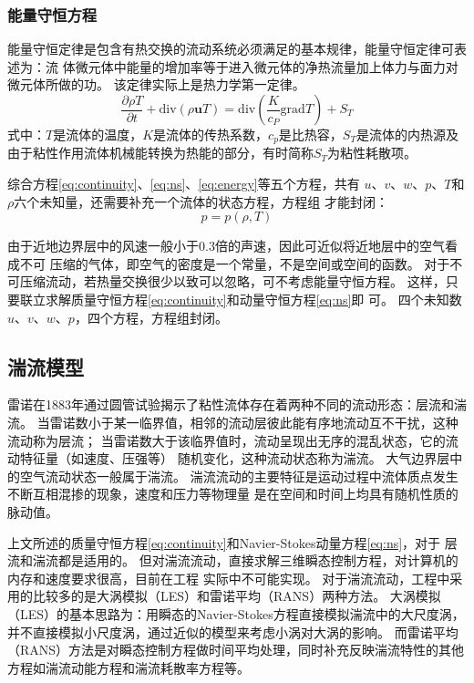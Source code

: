 \subsubsection{能量守恒方程}
能量守恒定律是包含有热交换的流动系统必须满足的基本规律，能量守恒定律可表述为：流
体微元体中能量的增加率等于进入微元体的净热流量加上体力与面力对微元体所做的功。
该定律实际上是热力学第一定律。
\begin{equation}
  \label{eq:energy}
  \frac{\partial \rho T}{\partial t} + \mathrm{div} (\rho \bm{u} T) =
  \mathrm{div} \left( \frac{K}{c_P} \bm{\mathrm{grad}} T \right) + S_T
\end{equation}
式中：$T$是流体的温度，$K$是流体的传热系数，$c_p$是比热容，$S_T$是流体的内热源及
由于粘性作用流体机械能转换为热能的部分，有时简称$S_T$为粘性耗散项。

综合方程\eqref{eq:continuity}、\eqref{eq:ns}、\eqref{eq:energy}等五个方程，共有
$u$、$v$、$w$、$p$、$T$和$\rho$六个未知量，还需要补充一个流体的状态方程，方程组
才能封闭：
\begin{equation}
  \label{eq:state}
  p = p(\rho, T)
\end{equation}

由于近地边界层中的风速一般小于$0.3$倍的声速，因此可近似将近地层中的空气看成不可
压缩的气体，即空气的密度是一个常量，不是空间或空间的函数。
对于不可压缩流动，若热量交换很少以致可以忽略，可不考虑能量守恒方程。
这样，只要联立求解质量守恒方程\eqref{eq:continuity}和动量守恒方程\eqref{eq:ns}即
可。
四个未知数$u$、$v$、$w$、$p$，四个方程，方程组封闭。

\subsection{湍流模型}

雷诺在1883年通过圆管试验揭示了粘性流体存在着两种不同的流动形态：层流和湍流。
当雷诺数小于某一临界值，相邻的流动层彼此能有序地流动互不干扰，这种流动称为层流；
当雷诺数大于该临界值时，流动呈现出无序的混乱状态，它的流动特征量（如速度、压强等）
随机变化，这种流动状态称为湍流。
大气边界层中的空气流动状态一般属于湍流。
湍流流动的主要特征是运动过程中流体质点发生不断互相混掺的现象，速度和压力等物理量
是在空间和时间上均具有随机性质的脉动值。

上文所述的质量守恒方程\eqref{eq:continuity}和Navier-Stokes动量方程\eqref{eq:ns}，对于
层流和湍流都是适用的。
但对湍流流动，直接求解三维瞬态控制方程，对计算机的内存和速度要求很高，目前在工程
实际中不可能实现。
对于湍流流动，工程中采用的比较多的是大涡模拟（LES）和雷诺平均（RANS）两种方法。
大涡模拟（LES）的基本思路为：用瞬态的Navier-Stokes方程直接模拟湍流中的大尺度涡，
并不直接模拟小尺度涡，通过近似的模型来考虑小涡对大涡的影响。
而雷诺平均（RANS）方法是对瞬态控制方程做时间平均处理，同时补充反映湍流特性的其他
方程如湍流动能方程和湍流耗散率方程等。


